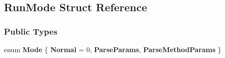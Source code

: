 \hypertarget{struct_run_mode}{}\subsection{Run\+Mode Struct Reference}
\label{struct_run_mode}
\subsubsection*{Public Types}
\begin{DoxyCompactItemize}
\item 
\hypertarget{struct_run_mode_ad4c583f1a925223571757cb63bfffc5b}{}enum {\bfseries Mode} \{ {\bfseries Normal} = 0, 
{\bfseries Parse\+Params}, 
{\bfseries Parse\+Method\+Params}
 \}\label{struct_run_mode_ad4c583f1a925223571757cb63bfffc5b}

\end{DoxyCompactItemize}
